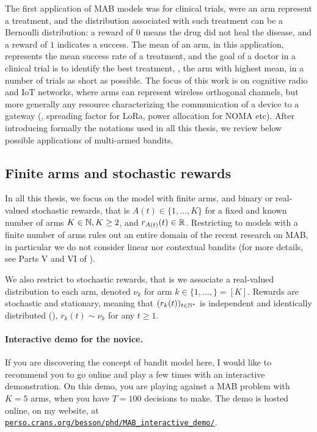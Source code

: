 The first application of MAB models was for clinical trials, were an arm represent a treatment, and the distribution associated with such treatment can be a Bernoulli distribution: a reward of $0$ means the drug did not heal the disease, and a reward of $1$ indicates a success. The mean of an arm, in this application, represents the mean success rate of a treatment, and the goal of a doctor in a clinical trial is to identify the best treatment, \ie, the arm with highest mean, in a number of trials as short as possible.
%
The focus of this work is on cognitive radio and IoT networks, where arms can represent wireless orthogonal channels, but more generally any resource characterizing the communication of a device to a gateway (\eg, spreading factor for LoRa, power allocation for NOMA etc).
%
After introducing formally the notations used in all this thesis, we review below possible applications of multi-armed bandits.


\subsection{Finite arms and stochastic rewards}


In all this thesis, we focus on the model with finite arms, and binary or real-valued stochastic rewards, that is $A(t)\in\{1,\dots,K\}$ for a fixed and known number of arms $K\in\mathbb{N},K\geq2$, and $r_{A(t)}(t)\in\mathbb{R}$.
%
Restricting to models with a finite number of arms
rules out an entire domain of the recent research on MAB, in particular we do not consider linear nor contextual bandits (for more details, see Parts V and VI of \cite{LattimoreBanditAlgorithmsBook}).

We also restrict to stochastic rewards, that is we associate a real-valued distribution to each arm, denoted $\nu_k$ for arm $k\in\{1,\dots,\}=[K]$.
Rewards are stochastic and stationary, meaning that $(r_k(t))_{t\in\mathbb{N}^*}$ is independent and identically distributed (\iid), $r_k(t) \sim \nu_k$ for any $t\geq1$.


\paragraph{Interactive demo for the novice.}
%
If you are discovering the concept of bandit model here, I would like to recommend you to go online and play a few times with an interactive demonstration.
On this demo, you are playing against a MAB problem with $K=5$ arms, when you have $T=100$ decisions to make.
The demo is hosted online, on my website, at \href{https://perso.crans.org/besson/phd/MAB\_interactive\_demo/}{\texttt{perso.crans.org/besson/phd/MAB\_interactive\_demo/}}.

